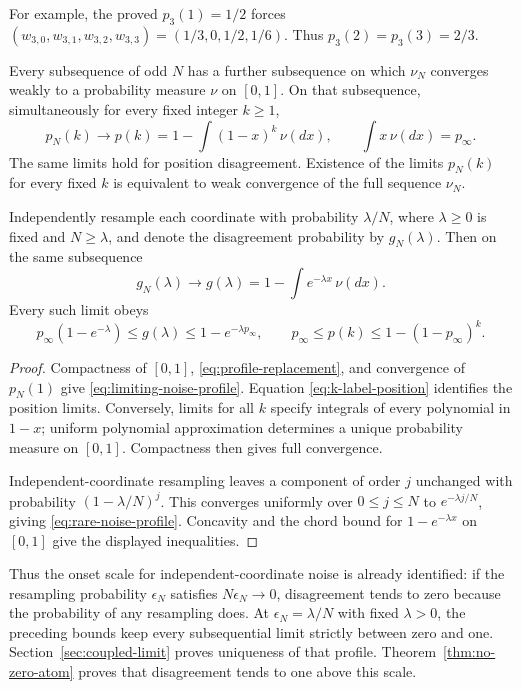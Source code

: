 \documentclass[11pt,letterpaper]{article}
\begin{document}
\noindent
For example, the proved $p_3(1)=1/2$ forces
$(w_{3,0},w_{3,1},w_{3,2},w_{3,3})=(1/3,0,1/2,1/6)$.
Thus $p_3(2)=p_3(3)=2/3$.

\begin{corollary}
\label{cor:spectral-limits}
Every subsequence of odd $N$ has a further subsequence on which
$\nu_N$ converges weakly to a probability measure $\nu$ on $[0,1]$.
On that subsequence, simultaneously for every fixed integer $k\ge1$,
\begin{equation}\label{eq:limiting-noise-profile}
 p_N(k)\longrightarrow p(k)=1-\int(1-x)^k\,\nu(dx),
 \qquad \int x\,\nu(dx)=p_\infty.
\end{equation}
The same limits hold for position disagreement. Existence of the
limits $p_N(k)$ for every fixed $k$ is equivalent to weak convergence
of the full sequence $\nu_N$.

Independently resample each coordinate with probability $\lambda/N$,
where $\lambda\ge0$ is fixed and $N\ge\lambda$, and denote the
disagreement probability by $g_N(\lambda)$. Then on the same subsequence
\begin{equation}\label{eq:rare-noise-profile}
 g_N(\lambda)\longrightarrow
       g(\lambda)=1-\int e^{-\lambda x}\,\nu(dx).
\end{equation}
Every such limit obeys
\[
 p_\infty(1-e^{-\lambda})
       \le g(\lambda)\le1-e^{-\lambda p_\infty},
 \qquad
 p_\infty\le p(k)\le1-(1-p_\infty)^k.
\]
\end{corollary}
\begin{proof}
Compactness of $[0,1]$, \eqref{eq:profile-replacement}, and convergence
of $p_N(1)$ give \eqref{eq:limiting-noise-profile}.
Equation \eqref{eq:k-label-position} identifies the position limits.
Conversely, limits for all $k$ specify integrals of every polynomial
in $1-x$; uniform polynomial approximation determines a unique
probability measure on $[0,1]$. Compactness then gives full convergence.

Independent-coordinate resampling leaves a component of order $j$
unchanged with probability $(1-\lambda/N)^j$. This converges uniformly
over $0\le j\le N$ to $e^{-\lambda j/N}$, giving
\eqref{eq:rare-noise-profile}. Concavity and the chord bound for
$1-e^{-\lambda x}$ on $[0,1]$ give the displayed inequalities.
\end{proof}

Thus the onset scale for independent-coordinate noise is already
identified: if the resampling probability $\epsilon_N$ satisfies
$N\epsilon_N\to0$, disagreement tends to zero because the probability
of any resampling does. At $\epsilon_N=\lambda/N$ with fixed
$\lambda>0$, the preceding bounds keep every subsequential limit
strictly between zero and one. Section~\ref{sec:coupled-limit}
proves uniqueness of that profile. Theorem~\ref{thm:no-zero-atom}
proves that disagreement tends to one above this scale.
\end{document}
